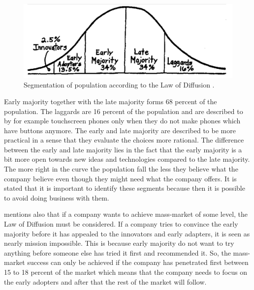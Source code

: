 \begin{figure}[ht]
  \begin{center}
    \includegraphics[scale=2, width=\textwidth]{dippa/images/lawofdiffusion.png}
    \caption{Segmentation of population according to the Law of Diffusion \parencite{Sinek:2009}.}
    \label{fig:lawofdiffusion}
  \end{center}
\end{figure}

Early majority together with the late majority forms 68 percent of the population. The laggards are 16 percent of the population and are described to by for example touchscreen phones only when they do not make phones which have buttons anymore. The early and late majority are described to be more practical in a sense that they evaluate the choices more rational. The difference between the early and late majority lies in the fact that the early majority is a bit more open towards new ideas and technologies compared to the late majority. The more right in the curve the population fall the less they believe what the company believe even though they might need what the company offers. It is stated that it is important to identify these segments because then it is possible to avoid doing business with them. \parencite{Sinek:2009}

\textcite{Sinek:2009} mentions also that if a company wants to achieve mass-market of some level, the Law of Diffusion must be considered. If a company tries to convince the early majority before it has appealed to the innovators and early adapters, it is seen as nearly mission impossible. This is because early majority do not want to try anything before someone else has tried it first and recommended it. So, the mass-market success can only be achieved if the company has penetrated first between 15 to 18 percent of the market which means that the company needs to focus on the early adopters and after that the rest of the market will follow.

